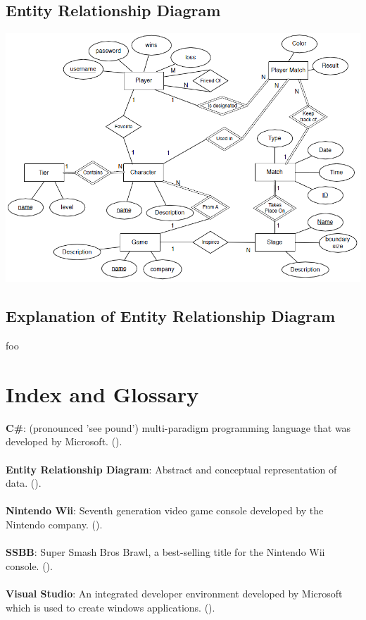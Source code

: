 \documentclass{article}
\begin{document}
\subsection{Entity Relationship Diagram}
\includegraphics[keepaspectratio, width=6in]{ER.png}\\
\subsection{Explanation of Entity Relationship Diagram}
foo

\section{Index and Glossary}
\textbf{C\#}: (pronounced 'see pound') multi-paradigm programming language that was developed by Microsoft. (\pageref{csharp}).\\ \\
\textbf{Entity Relationship Diagram}: Abstract and conceptual representation of data. (\pageref{erd}).\\ \\
\textbf{Nintendo Wii}: Seventh generation video game console developed by the Nintendo company. (\pageref{nwii}).\\ \\
\textbf{SSBB}: Super Smash Bros Brawl, a best-selling title for the Nintendo Wii console. (\pageref{ssbb}).\\ \\
\textbf{Visual Studio}: An integrated developer environment developed by Microsoft which is used to create windows applications. (\pageref{vstudio}).\\ \\
\end{document}
